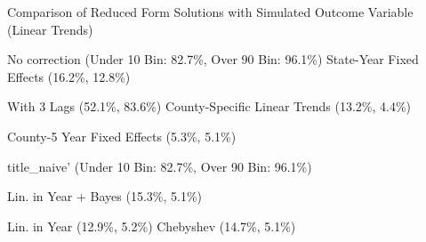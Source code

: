 \caption{Comparison of Reduced Form Solutions with Simulated Outcome Variable (Linear Trends) \label{fig:distributions-existing-solutions}}
\caption*{\color{p1line}{\textbf{\textemdash\textemdash}} No correction (Under 10 Bin: 82.7\%, Over 90 Bin: 96.1\%) \hspace{1cm} \color{p2line}{- - -} State-Year Fixed Effects (16.2\%, 12.8\%)}
\caption*{\color{p3line}{\textbf{- - -}} With 3 Lags (52.1\%, 83.6\%) \hspace{1cm} \color{p4line}{\textbf{- - -}} County-Specific Linear Trends (13.2\%, 4.4\%)}
\caption*{\color{p5line}{\textbf{- - -}} County-5 Year Fixed Effects (5.3\%, 5.1\%)}


\caption*{\color{p1line}{\textbf{\textemdash\textemdash}} title_naive' (Under 10 Bin: 82.7\%, Over 90 Bin: 96.1\%)}
\caption*{\color{p2line}{\textbf{- - -}} Lin. in Year + Bayes (15.3\%, 5.1\%)}
\caption*{\color{p3line}{\textbf{- - -}} Lin. in Year (12.9\%, 5.2\%) \hspace{1cm} \color{p4line}{\textbf{- - -}} Chebyshev (14.7\%, 5.1\%)}